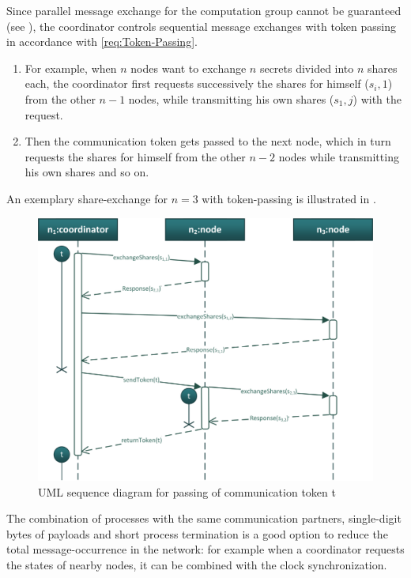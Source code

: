 Since parallel message exchange for the computation group cannot be guaranteed (see ), the coordinator controls sequential message exchanges with token passing in accordance with \ref{req:Token-Passing}. 
\begin{enumerate}
	\item For example, when $n$ nodes want to exchange $n$ secrets divided into $n$ shares each, the coordinator first requests successively the shares for himself ($s_i,1$) from the other $n-1$ nodes, while transmitting his own shares ($s_1,j$) with the request.
	\item Then the communication token gets passed to the next node, which in turn requests the shares for himself from the other $n-2$ nodes while transmitting his own shares and so on.
\end{enumerate}
 An exemplary share-exchange for $n=3$ with token-passing is illustrated in .

\begin{figure}[!htb] %
	\caption{\gls{UML} sequence diagram for passing of communication token t} \label{figure:coordinator token passing}
	\includegraphics[scale=1.0]{figures/token-passing-ion.png}
\end{figure}

The combination of processes with the same communication partners, single-digit bytes of payloads and short process termination is a good option to reduce the total message-occurrence in the network: for example when a coordinator requests the states of nearby nodes, it can be combined with the clock synchronization.

